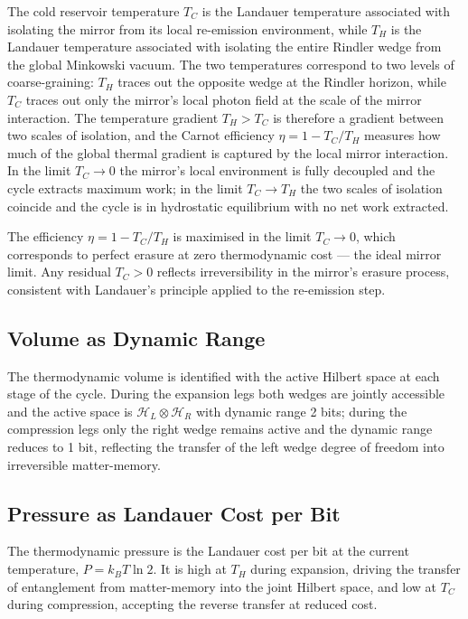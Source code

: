 \documentclass[12pt,a4paper]{article}
\begin{document}
The cold reservoir temperature $T_C$ is the Landauer 
temperature associated with isolating the mirror from 
its local re-emission environment, while $T_H$ is the 
Landauer temperature associated with isolating the entire 
Rindler wedge from the global Minkowski vacuum. The two 
temperatures correspond to two levels of coarse-graining: 
$T_H$ traces out the opposite wedge at the Rindler horizon, 
while $T_C$ traces out only the mirror's local photon field 
at the scale of the mirror interaction. The temperature 
gradient $T_H > T_C$ is therefore a gradient between 
two scales of isolation, and the Carnot efficiency 
$\eta = 1 - T_C/T_H$ measures how much of the global 
thermal gradient is captured by the local mirror 
interaction. In the limit $T_C \to 0$ the mirror's 
local environment is fully decoupled and the cycle 
extracts maximum work; in the limit $T_C \to T_H$ 
the two scales of isolation coincide and the cycle 
is in hydrostatic equilibrium with no net work extracted.


The efficiency $\eta = 1 - T_C/T_H$ is 
maximised in the limit $T_C \to 0$, which corresponds to 
perfect erasure at zero thermodynamic cost --- the ideal 
mirror limit. Any residual $T_C > 0$ reflects irreversibility 
in the mirror's erasure process, consistent with Landauer's 
principle applied to the re-emission step.

\subsection{Volume as Dynamic Range}

The thermodynamic volume is identified with the active 
Hilbert space at each stage of the cycle. During the 
expansion legs both wedges are jointly accessible and the 
active space is $\mathcal{H}_L \otimes \mathcal{H}_R$ with 
dynamic range 2 bits; during the compression legs only the 
right wedge remains active and the dynamic range reduces to 
1 bit, reflecting the transfer of the left wedge degree of 
freedom into irreversible matter-memory.

\subsection{Pressure as Landauer Cost per Bit}

The thermodynamic pressure is the Landauer cost per bit 
at the current temperature, $P = k_BT\ln 2$. It is high 
at $T_H$ during expansion, driving the transfer of 
entanglement from matter-memory into the joint Hilbert 
space, and low at $T_C$ during compression, accepting 
the reverse transfer at reduced cost.
\end{document}
